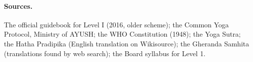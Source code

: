 \paragraph{Sources.} The official guidebook for Level I (2016, older scheme); the Common Yoga Protocol, Ministry of AYUSH; the WHO Constitution (1948); the Yoga Sutra; the Hatha Pradipika (English translation on Wikisource); the Gheranda Samhita (translations found by web search); the Board syllabus for Level 1.
